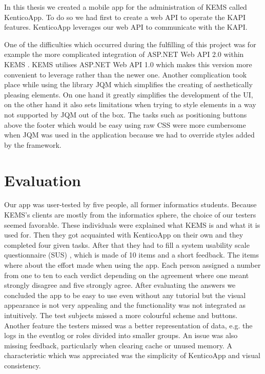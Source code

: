 In this thesis we created a mobile app for the administration of KEMS called KenticoApp. To do so we had first to create a web API to operate the KAPI features. KenticoApp leverages our web API to communicate with the KAPI. 

One of the difficulties which occurred during the fulfilling of this project was for example the more complicated integration of ASP.NET Web API 2.0 within KEMS \cite{kenticoWebAPI}. KEMS utilises ASP.NET Web API 1.0 which makes this version more convenient to leverage rather than the newer one. Another complication took place while using the library JQM which simplifies the creating of aesthetically pleasing elements. On one hand it greatly simplifies the development of the UI, on the other hand it also sets limitations when trying to style elements in a way not supported by JQM out of the box. The tasks such as positioning buttons above the footer which would be easy using raw CSS were more cumbersome when JQM was used in the application because we had to override styles added by the framework.

\section{Evaluation}
Our app was user-tested by five people, all former informatics students. Because KEMS's clients are mostly from the informatics sphere, the choice of our testers seemed favorable. These individuals were explained what KEMS is and what it is used for. Then they got acquainted with KenticoApp on their own and they completed four given tasks. After that they had to fill a system usability scale questionnaire (SUS) \cite{sus}, which is made of 10 items and a short feedback. The items where about the effort made when using the app. Each person assigned a number from one to ten to each verdict depending on the agreement where one meant strongly disagree and five strongly agree. After evaluating the answers we concluded the app to be easy to use even without any tutorial but the visual appearance is not very appealing and the functionality was not integrated as intuitively. The test subjects missed a more colourful scheme and buttons. Another feature the testers missed was a better representation of data, e.g. the logs in the eventlog or roles divided into smaller groups. An issue was also missing feedback, particularly when clearing cache or unused memory. A characteristic which was appreciated was the simplicity of KenticoApp and visual consistency.

